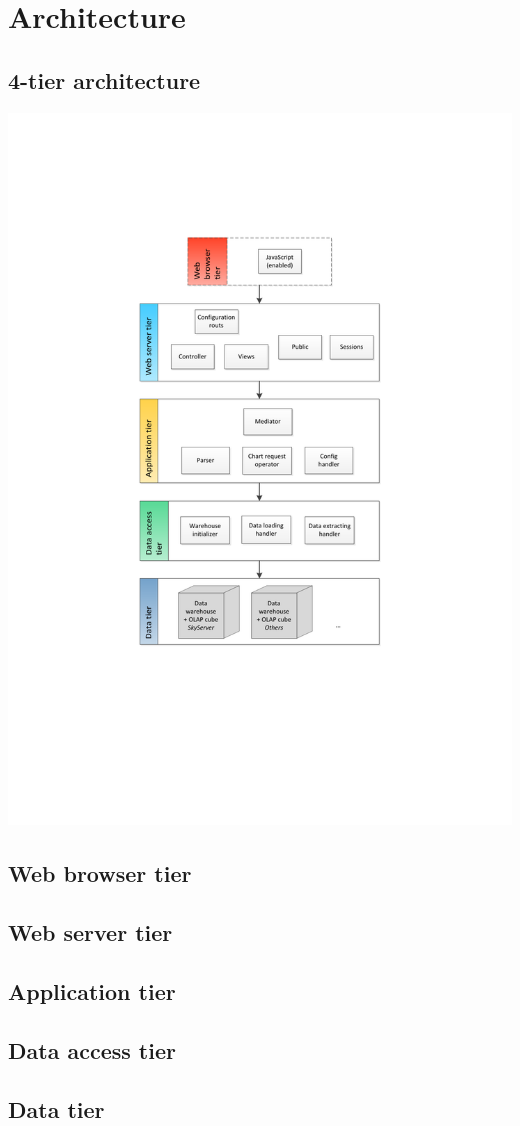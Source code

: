 \section{Architecture}

\subsection{4-tier architecture}

\begin{center}
\includegraphics[width=0.8\linewidth]{Pictures/Tier-archi.pdf} 
\end{center}   


\subsection{Web browser tier}

\subsection{Web server tier}

\subsection{Application tier}

\subsection{Data access tier}

\subsection{Data tier}